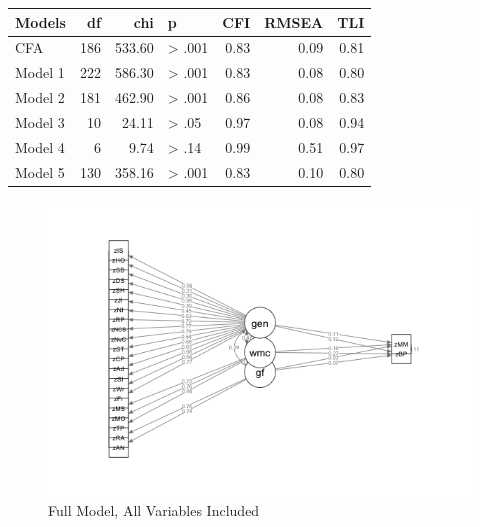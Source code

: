\documentclass[]{book}
\begin{document}
\begin{tabular}{l|r|r|l|r|r|r}
\hline
Models & df & chi & p & CFI & RMSEA & TLI\\
\hline
CFA & 186 & 533.60 & > .001 & 0.83 & 0.09 & 0.81\\
\hline
Model 1 & 222 & 586.30 & > .001 & 0.83 & 0.08 & 0.80\\
\hline
Model 2 & 181 & 462.90 & > .001 & 0.86 & 0.08 & 0.83\\
\hline
Model 3 & 10 & 24.11 & > .05 & 0.97 & 0.08 & 0.94\\
\hline
Model 4 & 6 & 9.74 & > .14 & 0.99 & 0.51 & 0.97\\
\hline
Model 5 & 130 & 358.16 & > .001 & 0.83 & 0.10 & 0.80\\
\hline
\end{tabular}

\begin{figure}

{\centering \includegraphics[width=1\linewidth]{img/sem1} 

}

\caption{Full Model, All Variables Included}\label{fig:model1}
\end{figure}
\end{document}
